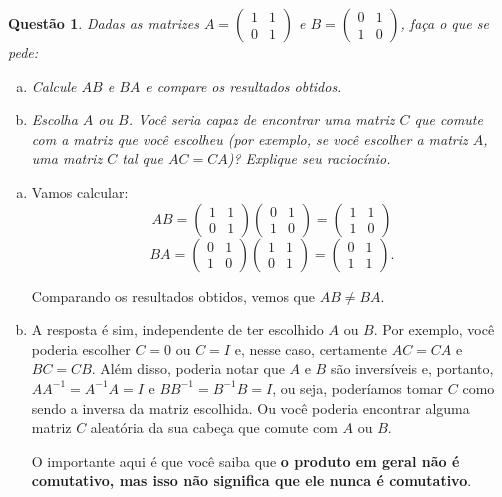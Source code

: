 \documentclass[a4paper,10pt]{article}
\newenvironment{sol}{\begin{tcolorbox}[breakable,colback=blue!5!white,colframe=blue!40!white,title=\normalsize {\sc{Solução}},coltitle=black]}{\end{tcolorbox}}
\newtheorem{qst}{Questão}
\begin{document}
\begin{qst}
	Dadas as matrizes $A=\begin{pmatrix}
	1&1\\0&1
	\end{pmatrix}$ e $B=\begin{pmatrix}
	0&1\\1&0
	\end{pmatrix}$, faça o que se pede:
	
	\begin{enumerate}[a)]
		\item Calcule $AB$ e $BA$ e compare os resultados obtidos.
		\item Escolha $A$ ou $B$. Você seria capaz de encontrar uma matriz $C$ que comute com a matriz que você escolheu (por exemplo, se você escolher a matriz $A$, uma matriz $C$ tal que $AC=CA$)? Explique seu raciocínio.
	\end{enumerate}
\end{qst}
\begin{sol}
	\begin{enumerate}[a)]
		\item Vamos calcular:
		\[AB=\begin{pmatrix}
		1&1\\0&1
		\end{pmatrix}\begin{pmatrix}
		0&1\\1&0
		\end{pmatrix}=\begin{pmatrix}
		1 & 1\\1&0
		\end{pmatrix}\]
		\[BA=\begin{pmatrix}
		0&1\\1&0
		\end{pmatrix}\begin{pmatrix}
		1&1\\0&1
		\end{pmatrix}=\begin{pmatrix}
		0&1\\1&1
		\end{pmatrix}.\]
		
		Comparando os resultados obtidos, vemos que $AB\neq BA$.
		\item A resposta é sim, independente de ter escolhido $A$ ou $B$. Por exemplo, você poderia escolher $C=0$ ou $C=I$ e, nesse caso, certamente $AC=CA$ e $BC=CB$. Além disso, poderia notar que $A$ e $B$ são inversíveis e, portanto, $AA^{-1}=A^{-1}A=I$ e $BB^{-1}=B^{-1}B=I$, ou seja, poderíamos tomar $C$ como sendo a inversa da matriz escolhida. Ou você poderia encontrar alguma matriz $C$ aleatória da sua cabeça que comute com $A$ ou $B$.
		
		O importante aqui é que você saiba que \textbf{o produto em geral não é comutativo, mas isso não significa que ele nunca é comutativo}.
	\end{enumerate}
\end{sol}\pagebreak
\end{document}
